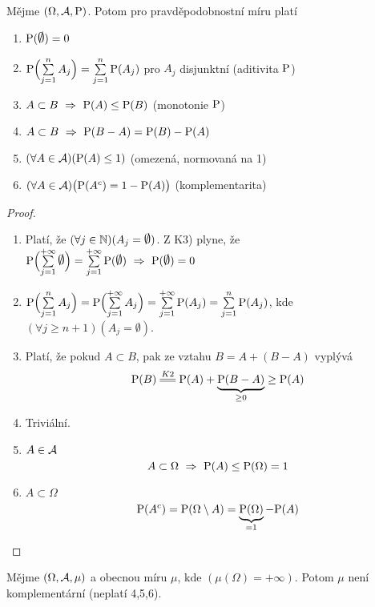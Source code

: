 \begin{theorem}
	Mějme $(\Omega,\mathcal{A},\mathrm{P})$. Potom pro pravděpodobnostní míru platí
	\begin{enumerate}
		\item $\PP(\emptyset)=0$
		\item $\mathrm{P}\Bigl(\sum\limits_{j=1}^{n}A_j\Bigr)=\sum\limits_{j=1}^{n}\mathrm{P}(A_j)$ pro $A_j$ disjunktní (aditivita $\mathrm{P}$)
		\item $A \subset B ~\Rightarrow~ \mathrm{P}(A) \leq \mathrm{P}(B)$ (monotonie $\mathrm{P}$)
		\item $A \subset B ~\Rightarrow~ \mathrm{P}(B-A)=\mathrm{P}(B)-\mathrm{P}(A)$
		\item $(\forall A \in \mathcal{A} )(\mathrm{P}(A)\leq 1)$ (omezená, normovaná na 1)
		\item $(\forall A \in \mathcal{A} )\bigl(\mathrm{P}(A^c)=1-\mathrm{P}(A)\bigr)$ (komplementarita)
	\end{enumerate}
\begin{proof}
	\begin{enumerate}
		\item Platí, že $(\forall j \in \N)(A_j=\emptyset)  $.
		Z K3) plyne, že $\PP\Bigl(\sum\limits_{j=1}^{+\infty}\emptyset\Bigr) = \sum\limits_{j=1}^{+\infty}\PP(\emptyset) ~\Rightarrow~ \PP(\emptyset) =0$
		
		\item $\mathrm{P}\Bigl(\sum\limits_{j=1}^{n}A_j\Bigr)=\mathrm{P}\Bigl(\sum\limits_{j=1}^{+\infty}A_j\Bigr)=\sum\limits_{j=1}^{+\infty}\mathrm{P}(A_j)=\sum\limits_{j=1}^{n}\mathrm{P}(A_j)$, kde $(\forall j\geq n+1)(A_j=\emptyset) $.
		
		\item Platí, že pokud $A \subset B$, pak ze vztahu $B=A+(B-A)$ vyplývá
		$$\PP(B)\equal{K2}\PP(A)+\underbrace{\PP(B-A)}_{\geq 0} \geq \PP(A)$$
		
		\item Triviální.
		
		\item $A \in \mathcal{A} $ $$A \subset \Omega ~\Rightarrow~ \mathrm{P}(A) \leq \mathrm{P}(\Omega)=1$$
		
		\item $A \subset \Omega$
		$$\mathrm{P}(A^c)=\mathrm{P}(\Omega \setminus A) =\underbrace{\mathrm{P}(\Omega)}_{=1}-\mathrm{P}(A)$$
	\end{enumerate}

\end{proof} 	
\end{theorem}
\begin{remark}
Mějme $(\Omega,\mathcal{A},\mu)$ a obecnou míru $\mu$, kde $(\mu(\Omega)=+\infty) $.
Potom $\mu$ není komplementární (neplatí 4,5,6).
\end{remark}

